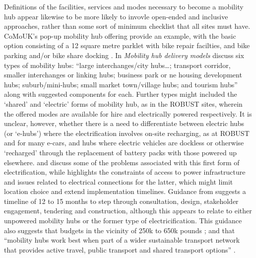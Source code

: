 \documentclass[preprint, 3p,
authoryear]{elsarticle} %
\begin{document}
Definitions of the facilities, services and modes necessary to become a
mobility hub appear likewise to be more likely to invovle open-ended and
inclusive approaches, rather than some sort of minimum checklist that
all sites must have. CoMoUK's pop-up mobility hub offering provide an
example, with the basic option consisting of a 12 square metre parklet
with bike repair facilties, and bike parking and/or bike share docking
\cite{CoMoUK:0aa}. In \emph{Mobility hub delivery models}
\cite{CoMoUK:2021aa} discuss six types of mobility hubs: ``large
interchanges/city hubs\ldots; transport corridor, smaller interchanges
or linking hubs; business park or ne housing development hubs;
suburb/mini-hubs; small market town/village hubs; and tourism hubs''
along with suggested components for each. Further types might included
the `shared' and `electric' forms of mobility hub, as in the ROBUST
sites, wherein the offered modes are available for hire and electrically
powered respectively. It is unclear, however, whether there is a need to
differentiate between electric hubs (or `e-hubs') where the
electrification involves on-site recharging, as at ROBUST and for many
e-cars, and hubs where electric vehicles are dockless or otherwise
`recharged' through the replacement of battery packs with those powered
up elsewhere. \cite{Meigs:2023aa} and \cite{Zhang:2022aa} discuss some
of the problems associated with this first form of electrification,
while \cite{Reynolds:0ab} highlights the constraints of access to power
infrastructure and issues related to electrical connections for the
latter, which might limit location choice and extend implementation
timelines. Guidance from \cite{CoMoUK:0ab} suggests a timeline of 12 to
15 months to step through consultation, design, stakeholder engagement,
tendering and construction, although this appears to relate to either
unpowered mobility hubs or the former type of electricification. This
guidance also suggests that budgets in the vicinity of 250k to 650k
pounds \cite{CoMoUK:0ac}; and that ``mobility hubs work best when part
of a wider sustainable transport network that provides active travel,
public transport and shared transport options'' \cite{CoMoUK:0aa}.
\end{document}

